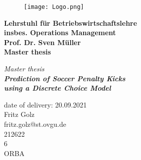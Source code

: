 \documentclass[12pt,dvipsnames]{article}%
\begin{document}
\sloppy 
\clearpage


\begin{titlepage}

\begin{center}
\smc

\begin{figure}
  \centering
 \texttt{[image: Logo.png]}\\
\end{figure}


\vspace*{1cm}

\begin{flushleft}
  \Large{\textbf{Lehrstuhl f\"{u}r Betriebswirtschaftslehre\\
insbes. Operations Management\\
Prof. Dr. Sven M\"{u}ller\\}}
\vspace*{1cm}
\large{\textbf{Master thesis}}
\end{flushleft}

\vspace*{2.5cm}

\begin{flushright}
\large{\textit{Master thesis\\
\textbf{Prediction of Soccer Penalty Kicks \\ using a Discrete Choice Model \\}}}

\vspace*{2.2cm}

\normalsize{date of delivery: 20.09.2021\\
\vspace*{1.3cm}
Fritz Golz\\
\vspace*{0.3cm}
fritz.golz@st.ovgu.de\\
\vspace*{0.3cm}
212622\\
\vspace*{0.3cm}
6\\
\vspace*{0.3cm}
ORBA}
\end{flushright}

\end{center}

\end{titlepage}
\end{document}
